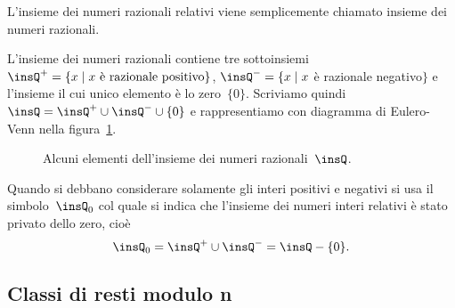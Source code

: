 \osservazione
L'insieme dei numeri razionali relativi viene semplicemente chiamato insieme dei numeri razionali.

L'insieme dei numeri razionali contiene tre sottoinsiemi~$\insQ^{+} =\{x \mid  x \text{ è razionale positivo}\}$, $\insQ^{-} =\{x \mid  x$ è razionale negativo$\}$
e l'insieme il cui unico elemento è lo zero~$\{0\}$. Scriviamo quindi~$\insQ = \insQ^{+}\cup \insQ^{-}\cup\{0\}$ e rappresentiamo con diagramma di Eulero-Venn nella figura~\ref{fig:E.7}.

\begin{figure}[htb]
 \centering
 \caption{Alcuni elementi dell'insieme dei numeri razionali~$\insQ$.}\label{fig:E.7}
\end{figure}

Quando si debbano considerare solamente gli interi positivi e negativi si usa il simbolo~$\insQ_0$ col quale si indica che l'insieme dei numeri interi
relativi è stato privato dello zero, cioè
\[\insQ_0 = \insQ^{+}\cup\insQ^{-} = \insQ -\{0\}.\]

\ovalbox{\risolvii \ref{ese:E.3}, \ref{ese:E.4}, \ref{ese:E.5}}

\subsection{Classi di resti modulo n}

